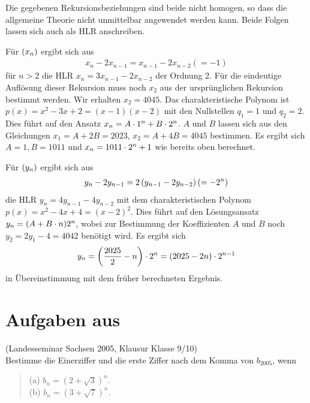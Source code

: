 \documentclass[11pt,a4paper]{article}
\begin{document}
Die gegebenen Rekursionsbeziehungen sind beide nicht homogen, so dass die
allgemeine Theorie nicht unmittelbar angewendet werden kann.  Beide Folgen
lassen sich auch als HLR anschreiben.

Für $\left(x_n\right)$ ergibt sich aus
\begin{gather*}
  x_n-2x_{n-1}=x_{n-1}-2x_{n-2}(=-1)
\end{gather*}
für $n>2$ die HLR $x_n=3x_{n-1}-2x_{n-2}$ der Ordnung 2.  Für die eindeutige
Auflösung dieser Rekursion muss noch $x_2$ aus der ursprünglichen Rekursion
bestimmt werden.  Wir erhalten $x_2=4045$. Das charakteristische Polynom ist
$p(x)=x^2-3x+2=(x-1)(x-2)$ mit den Nullstellen $q_1=1$ und $q_2=2$. Dies führt
auf den Ansatz $x_n=A\cdot1^n+B\cdot2^n$. $A$ und $B$ lassen sich aus den
Gleichungen $x_1=A+2B=2023$, $x_2=A+4B=4045$ bestimmen.  Es ergibt sich $A=1,
B=1011$ und $x_n=1011\cdot2^n+1$ wie bereits oben berechnet.

Für $\left(y_n\right)$ ergibt sich aus
\begin{gather*}
  y_n-2y_{n-1}=2\left(y_{n-1}-2y_{n-2}\right)(=-2^n)
\end{gather*}
die HLR $y_n=4y_{n-1}-4y_{n-2}$ mit dem charakteristischen Polynom
$p(x)=x^2-4x+4=(x-2)^2$.  Dies führt auf den Lösungsansatz $y_n=(A+B\cdot n)2^n$,
wobei zur Bestimmung der Koeffizienten $A$ und $B$ noch $y_2=2y_1-4=4042$
benötigt wird.  Es ergibt sich 
\begin{gather*}
  y_n=\left(\frac{2025}{2}-n\right)\cdot2^n =(2025-2n)\cdot2^{n-1}
\end{gather*}
in Übereinstimmung mit dem früher berechneten Ergebnis.

\section{Aufgaben aus \cite{b-schueler}}
\begin{aufgabe}
(Landesseminar Sachsen 2005, Klausur Klasse 9/10)\\ Bestimme die Einerziffer
  und die erste Ziffer nach dem Komma von $b_{2005}$, wenn
\begin{quote}
(a) $ b_n=(2+\sqrt{3})^{n}$.\\
(b) $ b_n=(3+\sqrt{7})^{n}$.
\end{quote}
\end{aufgabe}
\end{document}
